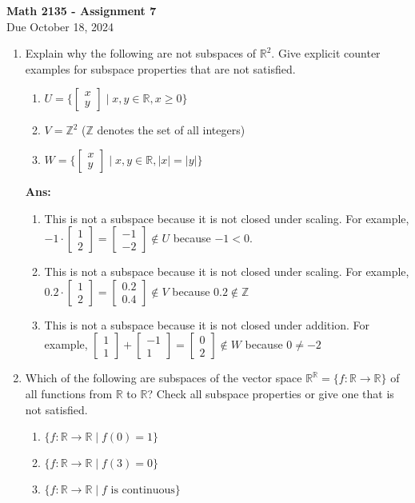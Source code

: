 \documentclass[12pt,oneside]{amsart}
\newcommand{\Z}{\mathbb{Z}}
\newcommand{\R}{\mathbb{R}}
\newcommand\sol[1]{
\medskip
\begin{mdframed}
\textbf{Ans:\\} #1
\end{mdframed}
\medskip
}
\newcommand{\vt}[2]{\left[\begin{matrix} #1 \\ #2 \end{matrix}\right]}
\begin{document}
\begin{center}
{\Large\textbf{Math 2135 - Assignment 7}}\\
\bigskip
Due October 18, 2024 \\
\end{center}
\bigskip
\thispagestyle{empty}


\begin{enumerate}
 \item
 Explain why the following are not subspaces of $\R^2$.
 Give explicit counter examples for subspace properties that are not satisfied. 
 \begin{enumerate}
 \item $U = \{ \vt{x}{y} \mid x,y\in\R, x\geq 0 \}$
 \item $V = \Z^2$ \quad ($\Z$ denotes the set of all integers)
 \item $W = \{ \vt{x}{y} \mid x,y\in\R, |x|=|y| \}$
 \end{enumerate}
 
 \sol{
  \begin{enumerate}
    \item This is not a subspace because it is not closed under scaling. For example, 
      $-1\cdot \vt{1}{2} = \vt{-1}{-2} \notin U$ because $-1 < 0$.
    \item This is not a subspace because it is not closed under scaling. For example,
      $0.2\cdot \vt{1}{2} = \vt{0.2}{0.4} \notin V$ because $0.2 \notin \Z$
    \item This is not a subspace because it is not closed under addition. For example,
      $\vt{1}{1} + \vt{-1}{1} = \vt{0}{2} \notin W$ because $0\neq-2$
  \end{enumerate}
 }

\item
 Which of the following are subspaces of the vector space $\R^\R = \{ f \colon \R \to \R \}$ of all functions from
 $\R$ to $\R$? Check all subspace properties or give one that is not satisfied.
\begin{enumerate}
\item $\{ f \colon \R \to \R \mid f(0) = 1 \}$
\item $\{ f \colon \R \to \R \mid f(3) = 0 \}$
\item $\{ f \colon \R \to \R \mid f \text{ is continuous} \}$
\end{enumerate}


\end{enumerate}
\end{document}
